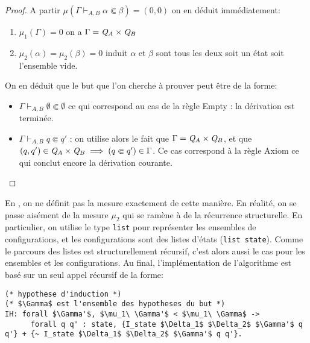 \begin{proof}
  A partir $\mu(\Gamma \vdash_{A, B} \alpha \Subset \beta) = (0, 0)$ on en déduit immédiatement:
  \begin{enumerate}
  \item $\mu_1(\Gamma) = 0$ on a $\Gamma = \mathit Q_A \times \mathit Q_B$ 
  \item $\mu_2(\alpha) = \mu_2(\beta) = 0$ induit $\alpha$ et $\beta$ sont tous les deux soit un état soit l'ensemble vide.
  \end{enumerate}
  On en déduit que le but que l'on cherche à prouver peut être de la forme:
  \begin{itemize}
  \item $\Gamma \vdash_{A, B} \emptyset \Subset \emptyset$ ce qui correspond au cas de la règle Empty : la dérivation est terminée.
  \item $\Gamma \vdash_{A, B} q \Subset q'$ : on utilise alors le fait que
    $\Gamma = \mathit Q_A \times \mathit Q_B$, et que $(q, q') \in \mathit Q_A\times\mathit Q_B \; \Longrightarrow \;
    (q \Subset q') \in \Gamma$. Ce cas correspond à la règle Axiom ce qui conclut encore la dérivation courante.
  \end{itemize}
\end{proof}

En \coq, on ne définit pas la mesure exactement de cette manière. En réalité, on se passe aisément
de la mesure $\mu_2$ qui se ramène à de la récurrence structurelle. 
En particulier, on utilise le type \lstinline!list! pour représenter les ensembles de configurations,
et les configurations sont des listes d'états (\lstinline!list state!). Comme le parcours des listes 
est structurellement récursif, c'est alors aussi le cas pour les ensembles et les configurations.
Au final, l'implémentation de l'algorithme est basé sur un seul appel récursif de la forme:
\begin{lstlisting}
(* hypothese d'induction *)
(* $\Gamma$ est l'ensemble des hypotheses du but *)
IH: forall $\Gamma'$, $\mu_1\ \Gamma'$ < $\mu_1\ \Gamma$ ->
      forall q q' : state, {I_state $\Delta_1$ $\Delta_2$ $\Gamma'$ q q'} + {~ I_state $\Delta_1$ $\Delta_2$ $\Gamma'$ q q'}.
\end{lstlisting}

